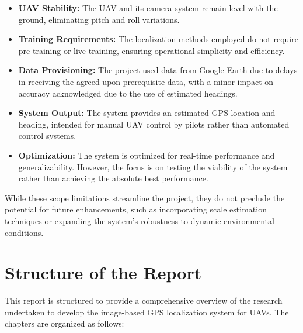 \begin{itemize}
    \item \textbf{UAV Stability:} The UAV and its camera system remain level with the ground, eliminating pitch and roll variations.
    
    \item \textbf{Training Requirements:} The localization methods employed do not require pre-training or live training, ensuring operational simplicity and efficiency.
    
    \item \textbf{Data Provisioning:} The project used data from Google Earth due to delays in receiving the agreed-upon prerequisite data, with a minor impact on accuracy acknowledged due to the use of estimated headings.
    
    \item \textbf{System Output:} The system provides an estimated GPS location and heading, intended for manual UAV control by pilots rather than automated control systems.
    
    \item \textbf{Optimization:} The system is optimized for real-time performance and generalizability. However, the focus is on testing the viability of the system rather than achieving the absolute best performance.
    
\end{itemize}

While these scope limitations streamline the project, they do not preclude the potential for future enhancements, such as incorporating scale estimation techniques or expanding the system's robustness to dynamic environmental conditions.

\section{Structure of the Report}
This report is structured to provide a comprehensive overview of the research undertaken to develop the image-based GPS localization system for UAVs. The chapters are organized as follows:

